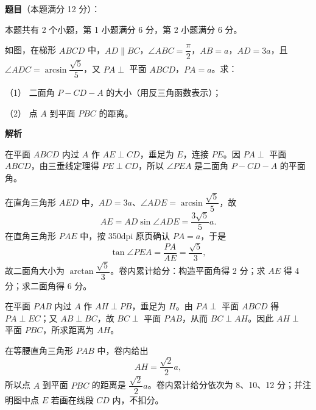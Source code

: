 \begin{answer}

\textbf{题目}（本题满分 12 分）：

本题共有 2 个小题，第 1 小题满分 6 分，第 2 小题满分 6 分。

如图，在梯形 $ABCD$ 中，$AD\parallel BC$，$\angle ABC=\dfrac\pi2$，$AB=a$，$AD=3a$，且 $\angle ADC=\arcsin\dfrac{\sqrt5}{5}$，又 $PA\perp$ 平面 $ABCD$，$PA=a$。求：

（1） 二面角 $P-CD-A$ 的大小（用反三角函数表示）；

（2） 点 $A$ 到平面 $PBC$ 的距离。
\nopagebreak[4]
\begin{center}\end{center}
\nopagebreak[4]
\textbf{解析}


在平面 $ABCD$ 内过 $A$ 作 $AE\perp CD$，垂足为 $E$，连接 $PE$。因 $PA\perp$ 平面 $ABCD$，由三垂线定理得 $PE\perp CD$，所以 $\angle PEA$ 是二面角 $P-CD-A$ 的平面角。

在直角三角形 $AED$ 中，$AD=3a$、$\angle ADE=\arcsin\dfrac{\sqrt5}{5}$，故
\nopagebreak[4]
\[
AE=AD\sin\angle ADE=\frac{3\sqrt5}{5}a.
\]
在直角三角形 $PAE$ 中，按 350dpi 原页确认 $PA=a$，于是
\nopagebreak[4]
\[
\tan\angle PEA=\frac{PA}{AE}=\frac{\sqrt5}{3},
\]
故二面角大小为 $\arctan\dfrac{\sqrt5}{3}$。卷内累计给分：构造平面角得 2 分；求 $AE$ 得 4 分；求二面角得 6 分。


在平面 $PAB$ 内过 $A$ 作 $AH\perp PB$，垂足为 $H$。由 $PA\perp$ 平面 $ABCD$ 得 $PA\perp EC$；又 $AB\perp BC$，故 $BC\perp$ 平面 $PAB$，从而 $BC\perp AH$。因此 $AH\perp$ 平面 $PBC$，所求距离为 $AH$。

在等腰直角三角形 $PAB$ 中，卷内给出
\nopagebreak[4]
\[
AH=\frac{\sqrt2}{2}a,
\]
所以点 $A$ 到平面 $PBC$ 的距离是 $\dfrac{\sqrt2}{2}a$。卷内累计给分依次为 8、10、12 分；并注明图中点 $E$ 若画在线段 $CD$ 内，不扣分。



\end{answer}

